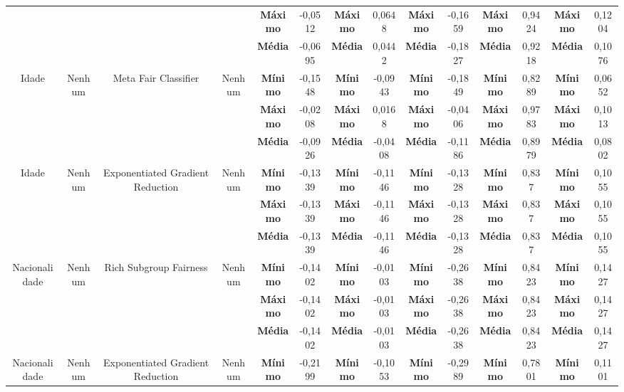 \documentclass[portugues]{ic-tese}
\begin{document}
\begin{table}[H]
\begin{center}
{\begin{tabular}{c|c|c|c|c|c|c|c|c|c|c|c|c|c}
             & & & & \textbf{Máximo} & -0,0512 & \textbf{Máximo} & 0,0648 & \textbf{Máximo} & -0,1659 & \textbf{Máximo} & 0,9424 & \textbf{Máximo} & 0,1204 \\
             & & & & \textbf{Média} & -0,0695 & \textbf{Média} & 0,0442 & \textbf{Média} & -0,1827 & \textbf{Média} & 0,9218 & \textbf{Média} & 0,1076 \\
            \hline
            \multirow{3}{*}{Idade} & \multirow{3}{*}{Nenhum} & \multirow{3}{*}{Meta Fair Classifier} & \multirow{3}{*}{Nenhum} & \textbf{Mínimo} & -0,1548 & \textbf{Mínimo} & -0,0943 & \textbf{Mínimo} & -0,1849 & \textbf{Mínimo} & 0,8289 & \textbf{Mínimo} & 0,0652 \\
             & & & & \textbf{Máximo} & -0,0208 & \textbf{Máximo} & 0,0168 & \textbf{Máximo} & -0,0406 & \textbf{Máximo} & 0,9783 & \textbf{Máximo} & 0,1013 \\
             & & & & \textbf{Média} & -0,0926 & \textbf{Média} & -0,0408 & \textbf{Média} & -0,1186 & \textbf{Média} & 0,8979 & \textbf{Média} & 0,0802 \\
            \hline
            \multirow{3}{*}{Idade} & \multirow{3}{*}{Nenhum} & \multirow{3}{*}{Exponentiated Gradient Reduction} & \multirow{3}{*}{Nenhum} & \textbf{Mínimo} & -0,1339 & \textbf{Mínimo} & -0,1146 & \textbf{Mínimo} & -0,1328 & \textbf{Mínimo} & 0,837 & \textbf{Mínimo} & 0,1055 \\
             & & & & \textbf{Máximo} & -0,1339 & \textbf{Máximo} & -0,1146 & \textbf{Máximo} & -0,1328 & \textbf{Máximo} & 0,837 & \textbf{Máximo} & 0,1055 \\
             & & & & \textbf{Média} & -0,1339 & \textbf{Média} & -0,1146 & \textbf{Média} & -0,1328 & \textbf{Média} & 0,837 & \textbf{Média} & 0,1055 \\
            \hline
            \multirow{3}{*}{Nacionalidade} & \multirow{3}{*}{Nenhum} & \multirow{3}{*}{Rich Subgroup Fairness} & \multirow{3}{*}{Nenhum} & \textbf{Mínimo} & -0,1402 & \textbf{Mínimo} & -0,0103 & \textbf{Mínimo} & -0,2638 & \textbf{Mínimo} & 0,8423 & \textbf{Mínimo} & 0,1427 \\
             & & & & \textbf{Máximo} & -0,1402 & \textbf{Máximo} & -0,0103 & \textbf{Máximo} & -0,2638 & \textbf{Máximo} & 0,8423 & \textbf{Máximo} & 0,1427 \\
             & & & & \textbf{Média} & -0,1402 & \textbf{Média} & -0,0103 & \textbf{Média} & -0,2638 & \textbf{Média} & 0,8423 & \textbf{Média} & 0,1427 \\
            \hline
            \multirow{3}{*}{Nacionalidade} & \multirow{3}{*}{Nenhum} & \multirow{3}{*}{Exponentiated Gradient Reduction} & \multirow{3}{*}{Nenhum} & \textbf{Mínimo} & -0,2199 & \textbf{Mínimo} & -0,1053 & \textbf{Mínimo} & -0,2989 & \textbf{Mínimo} & 0,7801 & \textbf{Mínimo} & 0,1101 \\

\end{tabular}}
\end{center}
\end{table}
\end{document}
